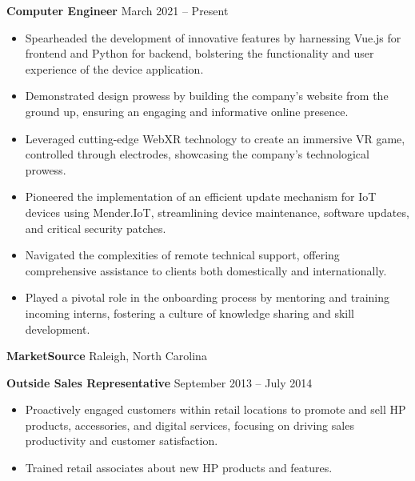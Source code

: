 \documentclass[11pt]{article}
\begin{document}
\textbf{Computer Engineer} \hfill March 2021 – Present
\begin{itemize}[noitemsep, topsep=0pt, partopsep=0pt, parsep=0pt]
    \item Spearheaded the development of innovative features by harnessing Vue.js for frontend and Python for backend, bolstering the functionality and user experience of the device application.
    \item Demonstrated design prowess by building the company’s website from the ground up, ensuring an engaging and informative online presence.
    \item Leveraged cutting-edge WebXR technology to create an immersive VR game, controlled through electrodes, showcasing the company’s technological prowess.
    \item Pioneered the implementation of an efficient update mechanism for IoT devices using Mender.IoT, streamlining device maintenance, software updates, and critical security patches.
    \item Navigated the complexities of remote technical support, offering comprehensive assistance to clients both domestically and internationally.
    \item Played a pivotal role in the onboarding process by mentoring and training incoming interns, fostering a culture of knowledge sharing and skill development.
\end{itemize}

\vspace{12pt}

\textbf{MarketSource} \hfill Raleigh, North Carolina

\textbf{Outside Sales Representative} \hfill September 2013 – July 2014
\begin{itemize}[noitemsep, topsep=0pt, partopsep=0pt, parsep=0pt]
    \item Proactively engaged customers within retail locations to promote and sell HP products, accessories, and digital services, focusing on driving sales productivity and customer satisfaction.
    \item Trained retail associates about new HP products and features.
\end{itemize}
\end{document}
